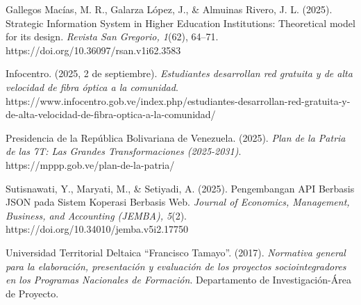 \documentclass[12pt, letterpaper]{article}
\begin{document}
	
	\begin{flushleft} %
	Gallegos Macías, M. R., Galarza López, J., \& Almuinas Rivero, J. L. (2025). Strategic Information System in Higher Education Institutions: Theoretical model for its design. \textit{Revista San Gregorio, 1}(62), 64–71. https://doi.org/10.36097/rsan.v1i62.3583
	
	Infocentro. (2025, 2 de septiembre). \textit{Estudiantes desarrollan red gratuita y de alta velocidad de fibra óptica a la comunidad}. https://www.infocentro.gob.ve/index.php/estudiantes-desarrollan-red-gratuita-y-de-alta-velocidad-de-fibra-optica-a-la-comunidad/
	
	Presidencia de la República Bolivariana de Venezuela. (2025). \textit{Plan de la Patria de las 7T: Las Grandes Transformaciones (2025-2031)}. https://mppp.gob.ve/plan-de-la-patria/
	
	Sutisnawati, Y., Maryati, M., \& Setiyadi, A. (2025). Pengembangan API Berbasis JSON pada Sistem Koperasi Berbasis Web. \textit{Journal of Economics, Management, Business, and Accounting (JEMBA), 5}(2). https://doi.org/10.34010/jemba.v5i2.17750
	
	Universidad Territorial Deltaica “Francisco Tamayo”. (2017). \textit{Normativa general para la elaboración, presentación y evaluación de los proyectos sociointegradores en los Programas Nacionales de Formación}. Departamento de Investigación-Área de Proyecto.
	\end{flushleft}
	
\end{document}
